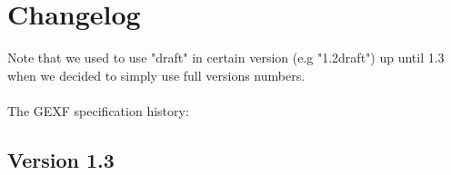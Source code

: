 \documentclass[a4paper,10pt]{article}
\begin{document}
\section{Changelog} \label{changelog}

Note that we used to use "draft" in certain version (e.g "1.2draft") up until 1.3 when we decided to simply use full versions numbers.

\paragraph{}
The GEXF specification history:

\subsection{Version 1.3}
\end{document}
